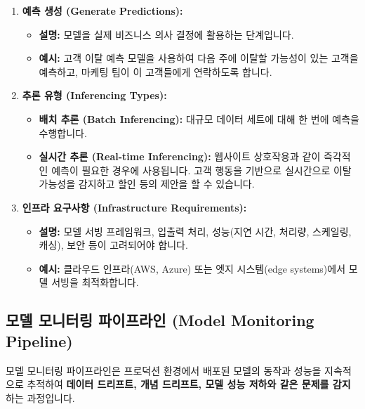 \documentclass[11pt,a4paper]{article}
\begin{document}
\begin{enumerate}
    \item \textbf{예측 생성 (Generate Predictions):}
    \begin{itemize}
        \item \textbf{설명:} 모델을 실제 비즈니스 의사 결정에 활용하는 단계입니다.
        \item \textbf{예시:} 고객 이탈 예측 모델을 사용하여 다음 주에 이탈할 가능성이 있는 고객을 예측하고, 마케팅 팀이 이 고객들에게 연락하도록 합니다.
    \end{itemize}

    \item \textbf{추론 유형 (Inferencing Types):}
    \begin{itemize}
        \item \textbf{배치 추론 (Batch Inferencing):} 대규모 데이터 세트에 대해 한 번에 예측을 수행합니다.
        \item \textbf{실시간 추론 (Real-time Inferencing):} 웹사이트 상호작용과 같이 즉각적인 예측이 필요한 경우에 사용됩니다. 고객 행동을 기반으로 실시간으로 이탈 가능성을 감지하고 할인 등의 제안을 할 수 있습니다.
    \end{itemize}

    \item \textbf{인프라 요구사항 (Infrastructure Requirements):}
    \begin{itemize}
        \item \textbf{설명:} 모델 서빙 프레임워크, 입출력 처리, 성능(지연 시간, 처리량, 스케일링, 캐싱), 보안 등이 고려되어야 합니다.
        \item \textbf{예시:} 클라우드 인프라(AWS, Azure) 또는 엣지 시스템(edge systems)에서 모델 서빙을 최적화합니다.
    \end{itemize}
\end{enumerate}

\subsection{모델 모니터링 파이프라인 (Model Monitoring Pipeline)}

\begin{summarybox}
모델 모니터링 파이프라인은 프로덕션 환경에서 배포된 모델의 동작과 성능을 지속적으로 추적하여 \textbf{데이터 드리프트, 개념 드리프트, 모델 성능 저하와 같은 문제를 감지}하는 과정입니다.
\end{summarybox}
\end{document}
